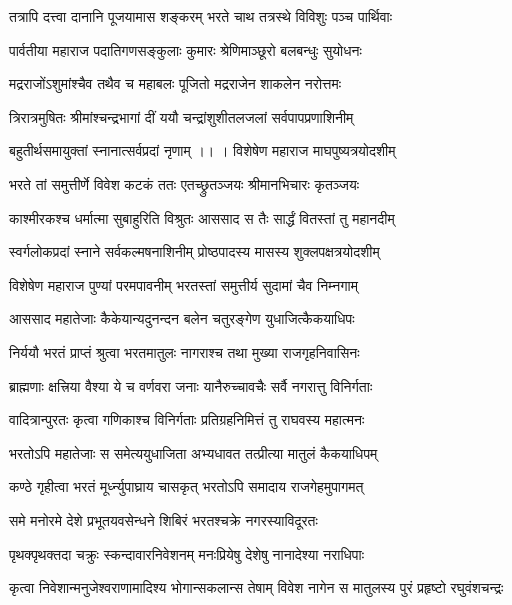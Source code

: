 \twolineshloka
{तत्रापि दत्त्वा दानानि पूजयामास शङ्करम्}
{भरते चाथ तत्रस्थे विविशुः पञ्च पार्थिवाः}%

\twolineshloka
{पार्वतीया महाराज पदातिगणसङ्कुलाः}
{कुमारः श्रेणिमाञ्छूरो बलबन्धुः सुयोधनः}%

\twolineshloka
{मद्रराजोंऽशुमांश्चैव तथैव च महाबलः}
{पूजितो मद्रराजेन शाकलेन नरोत्तमः}%

\twolineshloka
{त्रिरात्रमुषितः श्रीमांश्चन्द्रभागां दीं ययौ}
{चन्द्रांशुशीतलजलां सर्वपापप्रणाशिनीम्} %

\twolineshloka
{बहुतीर्थसमायुक्तां स्नानात्सर्वप्रदां नृणाम् ।। ।}
{विशेषेण महाराज माघपुष्यत्रयोदशीम्}%

\twolineshloka
{भरते तां समुत्तीर्णे विवेश कटकं ततः}
{एतच्छ्रुतञ्जयः श्रीमानभिचारः कृतञ्जयः}%

\twolineshloka
{काश्मीरकश्च धर्मात्मा सुबाहुरिति विश्रुतः}
{आससाद स तैः सार्द्धं वितस्तां तु महानदीम्}%

\twolineshloka
{स्वर्गलोकप्रदां स्नाने सर्वकल्मषनाशिनीम्}
{प्रोष्ठपादस्य मासस्य शुक्लपक्षत्रयोदशीम्}%

\twolineshloka
{विशेषेण महाराज पुण्यां परमपावनीम्}
{भरतस्तां समुत्तीर्य सुदामां चैव निम्नगाम्}%

\twolineshloka
{आससाद महातेजाः कैकेयान्यदुनन्दन}
{बलेन चतुरङ्गेण युधाजित्कैकयाधिपः}%

\twolineshloka
{निर्ययौ भरतं प्राप्तं श्रुत्वा भरतमातुलः}
{नागराश्च तथा मुख्या राजगृहनिवासिनः}%

\twolineshloka
{ब्राह्मणाः क्षत्त्रिया वैश्या ये च वर्णवरा जनाः}
{यानैरुच्चावचैः सर्वै नगरात्तु विनिर्गताः}%

\twolineshloka
{वादित्रान्पुरतः कृत्वा गणिकाश्च विनिर्गताः}
{प्रतिग्रहनिमित्तं तु राघवस्य महात्मनः}%

\twolineshloka
{भरतोऽपि महातेजाः स समेत्ययुधाजिता}
{अभ्यधावत तत्प्रीत्या मातुलं कैकयाधिपम्} %

\twolineshloka
{कण्ठे गृहीत्वा भरतं मूर्ध्न्युपाघ्राय चासकृत्}
{भरतोऽपि समादाय राजगेहमुपागमत्}%

\twolineshloka
{समे मनोरमे देशे प्रभूतयवसेन्धने}
{शिबिरं भरतश्चक्रे नगरस्याविदूरतः}%

\twolineshloka
{पृथक्पृथक्तदा चक्रुः स्कन्दावारनिवेशनम्}
{मनःप्रियेषु देशेषु नानादेश्या नराधिपाः}%

\twolineshloka
{कृत्वा निवेशान्मनुजेश्वराणामादिश्य भोगान्सकलान्स तेषाम्}
{विवेश नागेन स मातुलस्य पुरं प्रहृष्टो रघुवंशचन्द्रः}%

